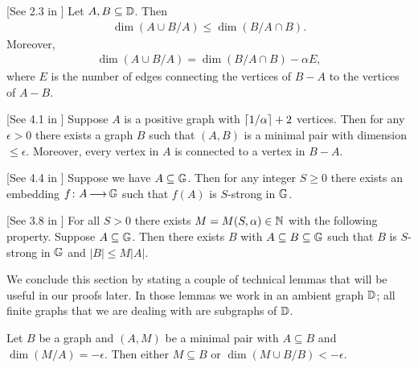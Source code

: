 \begin{Lemma} \label{diamond} [See 2.3 in \cite{laskowski}]
  Let $A, B \subseteq \mathbb D$.
  Then
  \begin{align*}
    \dim(A \cup B / A) \leq \dim(B / A \cap B).
  \end{align*}
  Moreover, 
  \begin{align*}
    \dim(A \cup B / A) = \dim(B / A \cap B) - \alpha E,
  \end{align*}
  where $E$ is the number of edges connecting the vertices of $B - A$ to the vertices of $A - B$.
\end{Lemma}

\begin{Lemma} \label{las_min} [See 4.1 in \cite{laskowski}]
  Suppose $A$ is a positive graph with $\left \lceil 1/\alpha \right \rceil + 2$ vertices.
  Then for any $\epsilon > 0$ there exists a graph $B$ such that $(A, B)$ is a minimal pair with dimension $\leq \epsilon$.
  Moreover, every vertex in $A$ is connected to a vertex in $B - A$.
\end{Lemma}

\begin{Lemma} \label{las_str} [See 4.4 in \cite{laskowski}]
  Suppose we have $A \subseteq \mathbb G$.
  Then for any integer $S \geq 0$ there exists an embedding $f \colon A \operatorname{\longrightarrow} \mathbb G$ such that $f(A)$ is $S$-strong in $\mathbb G$.
\end{Lemma}
    
\begin{Lemma} \label{las_closure} [See 3.8 in \cite{laskowski}]
  For all $S > 0$ there exists $M = M(S, \alpha) \in \mathbb{N}$ with the following property.
  Suppose $A \subseteq \mathbb G$.
  Then there exists $B$ with $A \subseteq B \subseteq \mathbb G$ such that $B$ is $S$-strong in $\mathbb G$ and $|B| \leq M|A|$.
\end{Lemma}

We conclude this section by stating a couple of technical lemmas that will be useful in our proofs later.
In those lemmas we work in an ambient graph $\mathbb D$; all finite graphs that we are dealing with are subgraphs of $\mathbb D$.

\begin{Lemma} \label{minimal_over_set}
  Let $B$ be a graph and $(A, M)$ be a minimal pair with $A \subseteq B$ and $\dim(M/A) = -\epsilon$.
  Then either $M \subseteq B$ or $\dim(M \cup B/B) < -\epsilon$.
\end{Lemma}

